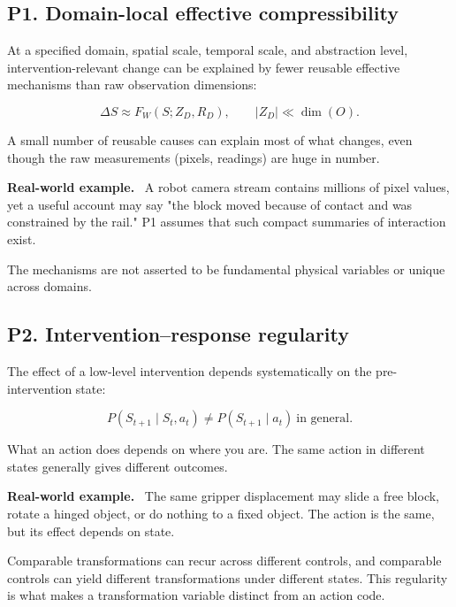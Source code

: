 \documentclass[11pt]{article}
\newenvironment{plainword}{%
  \par\medskip\noindent\begin{minipage}{\textwidth}%
  \color{gray!75!black}\small\itshape
}{%
  \end{minipage}\par\medskip}
\newenvironment{example}{%
  \par\smallskip\noindent\begin{minipage}{\textwidth}%
  \color{teal!60!black}\small
  \textbf{\color{teal!70!black}Real-world example.}\
}{%
  \end{minipage}\par\smallskip}
\begin{document}
\subsection*{P1. Domain-local effective compressibility}

At a specified domain, spatial scale, temporal scale, and abstraction level, intervention-relevant change can be explained by fewer
reusable effective mechanisms than raw observation dimensions:

\[
\boxed{\Delta S\approx F_W(S;Z_D,R_D),\qquad |Z_D|\ll \dim(O).}
\]

\begin{plainword}
A small number of reusable causes can explain most of what changes, even though the raw measurements (pixels, readings) are huge in
number.
\end{plainword}

\begin{example}
A robot camera stream contains millions of pixel values, yet a useful account may say "the block moved because of contact and was
constrained by the rail." P1 assumes that such compact summaries of interaction exist.
\end{example}

The mechanisms are not asserted to be fundamental physical variables or unique across domains.

\subsection*{P2. Intervention--response regularity}

The effect of a low-level intervention depends systematically on the pre-intervention state:

\[
\boxed{P(S_{t+1}\mid S_t,a_t)\neq P(S_{t+1}\mid a_t)\ \text{in general}.}
\]

\begin{plainword}
What an action does depends on where you are. The same action in different states generally gives different outcomes.
\end{plainword}

\begin{example}
The same gripper displacement may slide a free block, rotate a hinged object, or do nothing to a fixed object. The action is the same,
but its effect depends on state.
\end{example}

Comparable transformations can recur across different controls, and comparable controls can yield different transformations under
different states. This regularity is what makes a transformation variable distinct from an action code.
\end{document}
